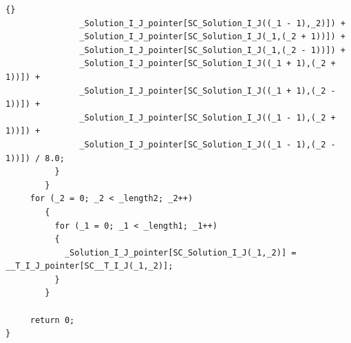 \documentclass[10pt]{article}
\begin{document}
\begin{lstlisting}{}
               _Solution_I_J_pointer[SC_Solution_I_J((_1 - 1),_2)]) +
               _Solution_I_J_pointer[SC_Solution_I_J(_1,(_2 + 1))]) +
               _Solution_I_J_pointer[SC_Solution_I_J(_1,(_2 - 1))]) +
               _Solution_I_J_pointer[SC_Solution_I_J((_1 + 1),(_2 + 1))]) +
               _Solution_I_J_pointer[SC_Solution_I_J((_1 + 1),(_2 - 1))]) +
               _Solution_I_J_pointer[SC_Solution_I_J((_1 - 1),(_2 + 1))]) +
               _Solution_I_J_pointer[SC_Solution_I_J((_1 - 1),(_2 - 1))]) / 8.0; 
          }
        } 
     for (_2 = 0; _2 < _length2; _2++)
        { 
          for (_1 = 0; _1 < _length1; _1++)
          { 
            _Solution_I_J_pointer[SC_Solution_I_J(_1,_2)] = __T_I_J_pointer[SC__T_I_J(_1,_2)]; 
          } 
        } 

     return 0;
} 

\end{lstlisting}

\end{document}

